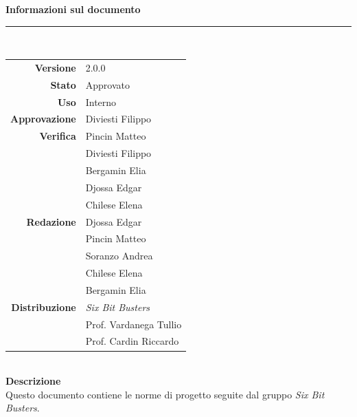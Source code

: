 \begin{titlepage}
\begin{center}
	\large \textbf{Informazioni sul documento} \\
	\rule{0.6\textwidth}{0.4pt}
	\\[0.5cm]
	\begin{tabular}{r|l}
		\textbf{Versione} & 2.0.0\\
		\textbf{Stato} & Approvato\\
		\textbf{Uso} & Interno\\                         
		\textbf{Approvazione} & Diviesti Filippo\\                      
		\textbf{Verifica} & Pincin Matteo\\ & Diviesti Filippo\\ & Bergamin Elia\\ & Djossa Edgar\\ &Chilese Elena \\                     
		\textbf{Redazione} & Djossa Edgar \\ & Pincin Matteo \\ & Soranzo Andrea\\ & Chilese Elena \\ & Bergamin Elia\\
		\textbf{Distribuzione} & \textit{Six Bit Busters} \\ & Prof. Vardanega Tullio \\ & Prof. Cardin Riccardo
	\end{tabular}	
	\\[0.8cm]

	\large \textbf{Descrizione} \\
	Questo documento contiene le norme di progetto seguite dal gruppo \textit{Six Bit Busters}.
	
	
	
	\end{center}
\end{titlepage}
